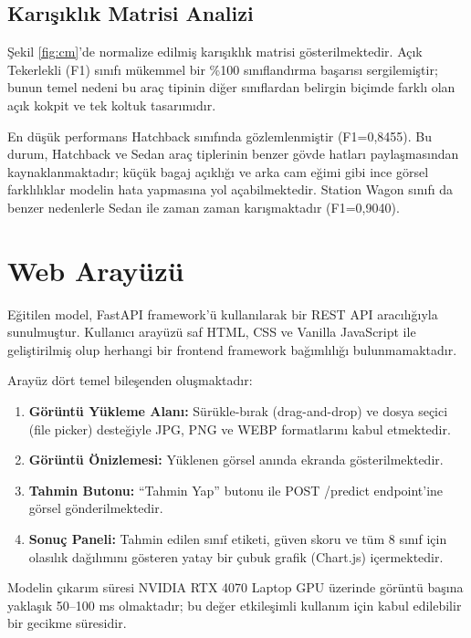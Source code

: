 \documentclass[conference]{IEEEtran}
\begin{document}
\subsection{Karışıklık Matrisi Analizi}

Şekil \ref{fig:cm}'de normalize edilmiş karışıklık matrisi gösterilmektedir.
Açık Tekerlekli (F1) sınıfı mükemmel bir \%100 sınıflandırma başarısı
sergilemiştir; bunun temel nedeni bu araç tipinin diğer sınıflardan belirgin
biçimde farklı olan açık kokpit ve tek koltuk tasarımıdır.

En düşük performans Hatchback sınıfında gözlemlenmiştir (F1=0,8455). Bu
durum, Hatchback ve Sedan araç tiplerinin benzer gövde hatları paylaşmasından
kaynaklanmaktadır; küçük bagaj açıklığı ve arka cam eğimi gibi ince
görsel farklılıklar modelin hata yapmasına yol açabilmektedir.
Station Wagon sınıfı da benzer nedenlerle Sedan ile zaman zaman karışmaktadır
(F1=0,9040).

\section{Web Arayüzü}

Eğitilen model, FastAPI \cite{fastapi} framework'ü kullanılarak bir REST API
aracılığıyla sunulmuştur. Kullanıcı arayüzü saf HTML, CSS ve Vanilla
JavaScript ile geliştirilmiş olup herhangi bir frontend framework bağımlılığı
bulunmamaktadır.

Arayüz dört temel bileşenden oluşmaktadır:
\begin{enumerate}
  \item \textbf{Görüntü Yükleme Alanı:} Sürükle-bırak (drag-and-drop) ve
        dosya seçici (file picker) desteğiyle JPG, PNG ve WEBP
        formatlarını kabul etmektedir.
  \item \textbf{Görüntü Önizlemesi:} Yüklenen görsel anında
        ekranda gösterilmektedir.
  \item \textbf{Tahmin Butonu:} ``Tahmin Yap'' butonu ile POST /predict
        endpoint'ine görsel gönderilmektedir.
  \item \textbf{Sonuç Paneli:} Tahmin edilen sınıf etiketi, güven skoru ve
        tüm 8 sınıf için olasılık dağılımını gösteren yatay bir
        çubuk grafik (Chart.js) içermektedir.
\end{enumerate}

Modelin çıkarım süresi NVIDIA RTX 4070 Laptop GPU üzerinde görüntü başına
yaklaşık 50--100 ms olmaktadır; bu değer etkileşimli kullanım için
kabul edilebilir bir gecikme süresidir.
\end{document}
